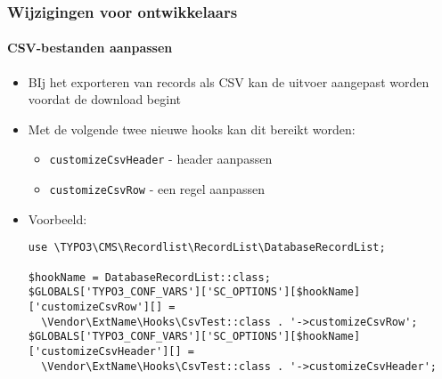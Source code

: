 
\begin{frame}[fragile]
	\frametitle{Wijzigingen voor ontwikkelaars}
	\framesubtitle{CSV-bestanden aanpassen}

	\lstset{basicstyle=\tiny\ttfamily}

	\begin{itemize}
		\item BIj het exporteren van records als CSV kan de uitvoer
			aangepast worden voordat de download begint
		\item Met de volgende twee nieuwe hooks kan dit bereikt worden:

			\begin{itemize}
			\smaller
				\item \texttt{customizeCsvHeader} - header aanpassen
				\item \texttt{customizeCsvRow} - een regel aanpassen
			\end{itemize}

		\item Voorbeeld:

			\begin{lstlisting}
use \TYPO3\CMS\Recordlist\RecordList\DatabaseRecordList;

$hookName = DatabaseRecordList::class;
$GLOBALS['TYPO3_CONF_VARS']['SC_OPTIONS'][$hookName]['customizeCsvRow'][] =
  \Vendor\ExtName\Hooks\CsvTest::class . '->customizeCsvRow';
$GLOBALS['TYPO3_CONF_VARS']['SC_OPTIONS'][$hookName]['customizeCsvHeader'][] =
  \Vendor\ExtName\Hooks\CsvTest::class . '->customizeCsvHeader';
\end{lstlisting}

	\end{itemize}

\end{frame}


